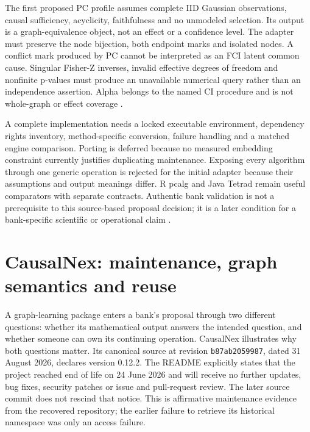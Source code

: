 The first proposed PC profile assumes complete IID Gaussian observations,
causal sufficiency, acyclicity, faithfulness and no unmodeled selection. Its
output is a graph-equivalence object, not an effect or a confidence level. The
adapter must preserve the node bijection, both endpoint marks and isolated
nodes. A conflict mark produced by PC cannot be interpreted as an FCI latent
common cause. Singular Fisher-Z inverses, invalid effective degrees of freedom
and nonfinite p-values must produce an unavailable numerical query rather than
an independence assertion. Alpha belongs to the named CI procedure and is not
whole-graph or effect coverage \citep{exec14_causallearn_reuse}.

A complete implementation needs a locked executable environment, dependency
rights inventory, method-specific conversion, failure handling and a matched
engine comparison. Porting is deferred because no measured embedding constraint
currently justifies duplicating maintenance. Exposing every algorithm through
one generic operation is rejected for the initial adapter because their
assumptions and output meanings differ. R pcalg and Java Tetrad remain useful
comparators with separate contracts. Authentic bank validation is not a
prerequisite to this source-based proposal decision; it is a later condition
for a bank-specific scientific or operational claim
\citep{exec14_causallearn_reuse}.


\section{CausalNex: maintenance, graph semantics and reuse}
\label{exec14:causalnex}

A graph-learning package enters a bank's proposal through two different
questions: whether its mathematical output answers the intended question, and
whether someone can own its continuing operation. CausalNex illustrates why
both questions matter. Its canonical source at revision
\texttt{b87ab2059987}, dated 31 August 2026, declares version 0.12.2. The README
explicitly states that the project reached end of life on 24 June 2026 and
will receive no further updates, bug fixes, security patches or issue and
pull-request review. The later source commit does not rescind that notice.
This is affirmative maintenance evidence from the recovered repository; the
earlier failure to retrieve its historical namespace was only an access
failure.~\citep{exec14_causalnex_primary}

